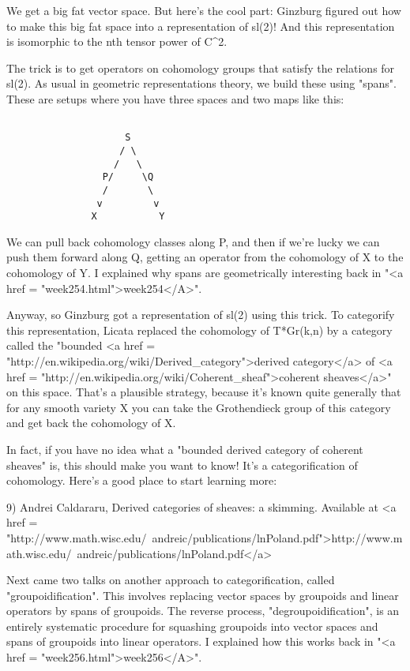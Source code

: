 We get a big fat vector space.  But here's the cool part: Ginzburg
figured out how to make this big fat space into a representation of
sl(2)!  And this representation is isomorphic to the nth tensor power
of C^{2}.

The trick is to get operators on cohomology groups that satisfy the
relations for sl(2).  As usual in geometric representations theory, we
build these using "spans".  These are setups where you have
three spaces and two maps like this:


\begin{verbatim}

                     S
                    / \
                   /   \
                 P/     \Q
                 /       \
                v         v 
               X           Y

\end{verbatim}
    
We can pull back cohomology classes along P, and then if we're lucky
we can push them forward along Q, getting an operator from the
cohomology of X to the cohomology of Y.  I explained why spans are
geometrically interesting back in "<a href = "week254.html">week254</A>".

Anyway, so Ginzburg got a representation of sl(2) using this trick.
To categorify this representation, Licata replaced the cohomology of
T*Gr(k,n) by a category called the "bounded <a href =
"http://en.wikipedia.org/wiki/Derived_category">derived category</a>
of <a href = "http://en.wikipedia.org/wiki/Coherent_sheaf">coherent
sheaves</a>" on this space.  That's a plausible strategy, because
it's known quite generally that for any smooth variety X you can take
the Grothendieck group of this category and get back the cohomology of
X.

In fact, if you have no idea what a "bounded derived category of
coherent sheaves" is, this should make you want to know!  It's a
categorification of cohomology.  Here's a good place to start learning
more:

9) Andrei Caldararu, Derived categories of sheaves: a skimming.
Available at 
<a href = "http://www.math.wisc.edu/~andreic/publications/lnPoland.pdf">http://www.math.wisc.edu/~andreic/publications/lnPoland.pdf</a>

Next came two talks on another approach to categorification, called
"groupoidification".  This involves replacing vector spaces
by groupoids and linear operators by spans of groupoids.  The reverse
process, "degroupoidification", is an entirely systematic
procedure for squashing groupoids into vector spaces and spans of
groupoids into linear operators.  I explained how this works back in
"<a href = "week256.html">week256</A>".

